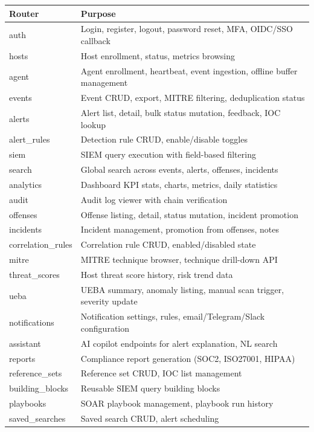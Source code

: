 \begin{longtable}{|l|l|}
\hline
\textbf{Router} & \textbf{Purpose} \\
\hline
auth & Login, register, logout, password reset, MFA, OIDC/SSO callback \\
hosts & Host enrollment, status, metrics browsing \\
agent & Agent enrollment, heartbeat, event ingestion, offline buffer management \\
events & Event CRUD, export, MITRE filtering, deduplication status \\
alerts & Alert list, detail, bulk status mutation, feedback, IOC lookup \\
alert\_rules & Detection rule CRUD, enable/disable toggles \\
siem & SIEM query execution with field-based filtering \\
search & Global search across events, alerts, offenses, incidents \\
analytics & Dashboard KPI stats, charts, metrics, daily statistics \\
audit & Audit log viewer with chain verification \\
offenses & Offense listing, detail, status mutation, incident promotion \\
incidents & Incident management, promotion from offenses, notes \\
correlation\_rules & Correlation rule CRUD, enabled/disabled state \\
mitre & MITRE technique browser, technique drill-down API \\
threat\_scores & Host threat score history, risk trend data \\
ueba & UEBA summary, anomaly listing, manual scan trigger, severity update \\
notifications & Notification settings, rules, email/Telegram/Slack configuration \\
assistant & AI copilot endpoints for alert explanation, NL search \\
reports & Compliance report generation (SOC2, ISO27001, HIPAA) \\
reference\_sets & Reference set CRUD, IOC list management \\
building\_blocks & Reusable SIEM query building blocks \\
playbooks & SOAR playbook management, playbook run history \\
saved\_searches & Saved search CRUD, alert scheduling \\

\end{longtable}
